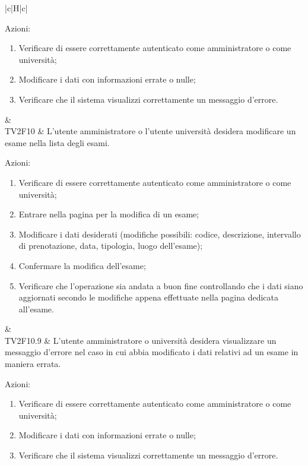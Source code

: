 \begin{longtable}{|c|H|c|}
\begin{flushleft}
			Azioni:\newline
		\end{flushleft} 
		\begin{enumerate}
			\item Verificare di essere correttamente autenticato come amministratore o come università;
			\item Modificare i dati con informazioni errate o nulle;
			\item Verificare che il sistema visualizzi correttamente un messaggio d'errore.
		\end{enumerate}  & \Ts \\
		\hline
		TV2F10 & L'utente amministratore o l'utente università desidera modificare un esame nella lista degli esami. \newline \begin{flushleft}
			Azioni:\newline
		\end{flushleft}
		\begin{enumerate}
			\item Verificare di essere correttamente autenticato come amministratore o come università;
			\item Entrare nella pagina per la modifica di un esame;
			\item Modificare i dati desiderati (modifiche possibili: codice, descrizione, intervallo di prenotazione, data, tipologia, luogo dell'esame);
			\item Confermare la modifica dell'esame;
			\item Verificare che l'operazione sia andata a buon fine controllando che i dati siano aggiornati secondo le modifiche appena effettuate nella pagina dedicata all'esame.
		\end{enumerate} & \Ts \\
		\hline
		TV2F10.9 & L'utente amministratore o università desidera visualizzare un messaggio d'errore nel caso in cui abbia modificato i dati relativi ad un esame in maniera errata. \newline \begin{flushleft}
			Azioni:\newline
		\end{flushleft} 
		\begin{enumerate}
			\item Verificare di essere correttamente autenticato come amministratore o come università;
			\item Modificare i dati con informazioni errate o nulle;
			\item Verificare che il sistema visualizzi correttamente un messaggio d'errore.

\end{enumerate}
\end{longtable}
